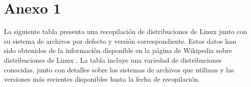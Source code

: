 \documentclass[12pt, a4paper]{book}
\begin{document}











\printbibliography
{}\label{Bibliografía} %

\appendix
\chapter{Anexo 1} \label{sec:anexo}

La siguiente tabla presenta una recopilación de distribuciones de Linux junto con su sistema de archivos por defecto y versión correspondiente. Estos datos han sido obtenidos de la información disponible en la página de Wikipedia sobre distribuciones de Linux \cite{wiki-linux-distributions}. La tabla incluye una variedad de distribuciones conocidas, junto con detalles sobre los sistemas de archivos que utilizan y las versiones más recientes disponibles hasta la fecha de recopilación.
\end{document}
